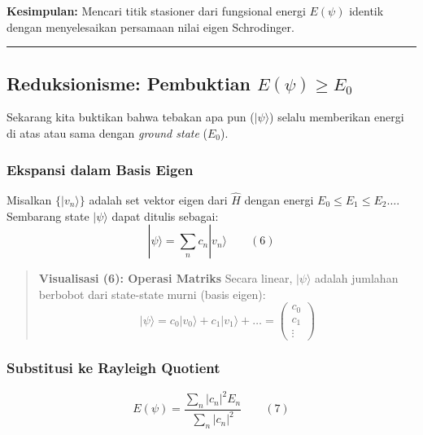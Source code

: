 \textbf{Kesimpulan:} Mencari titik stasioner dari fungsional energi \(E(\psi)\) identik dengan menyelesaikan persamaan nilai eigen Schrodinger.

\begin{center}\rule{0.5\linewidth}{0.5pt}\end{center}

\hypertarget{reduksionisme-pembuktian-epsi-ge-e_0}{%
\subsection{\texorpdfstring{Reduksionisme: Pembuktian \(E(\psi) \ge E_0\)}{Reduksionisme: Pembuktian E(\textbackslash psi) \textbackslash ge E\_0}}\label{reduksionisme-pembuktian-epsi-ge-e_0}}

Sekarang kita buktikan bahwa tebakan apa pun (\(|\psi\rangle\)) selalu memberikan energi di atas atau sama dengan \emph{ground state} (\(E_0\)).

\hypertarget{a.-ekspansi-dalam-basis-eigen}{%
\subsubsection{Ekspansi dalam Basis Eigen}\label{a.-ekspansi-dalam-basis-eigen}}

Misalkan \(\{|v_n\rangle\}\) adalah set vektor eigen dari \(\hat{H}\) dengan energi \(E_0 \le E_1 \le E_2 \dots\). Sembarang state \(|\psi\rangle\) dapat ditulis sebagai: \[ |\psi\rangle = \sum_n c_n |v_n\rangle \qquad (6) \]

\begin{quote}
\textbf{Visualisasi (6): Operasi Matriks} Secara linear, \(|\psi\rangle\) adalah jumlahan berbobot dari state-state murni (basis eigen): \[ |\psi\rangle = c_0 |v_0\rangle + c_1 |v_1\rangle + \dots = \begin{pmatrix} c_0 \\ c_1 \\ \vdots \end{pmatrix} \]
\end{quote}

\hypertarget{b.-substitusi-ke-rayleigh-quotient}{%
\subsubsection{Substitusi ke Rayleigh Quotient}\label{b.-substitusi-ke-rayleigh-quotient}}

\[ E(\psi) = \frac{\sum_n |c_n|^2 E_n}{\sum_n |c_n|^2} \qquad (7) \]

